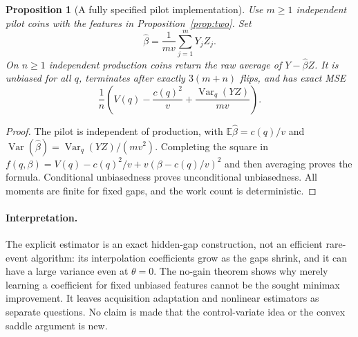 \documentclass[11pt]{article}
\newtheorem{proposition}[theorem]{Proposition}
\newcommand{\E}{\mathbb E}
\newcommand{\Var}{\operatorname{Var}}
\begin{document}
\begin{proposition}[A fully specified pilot implementation]
Use $m\ge1$ independent pilot coins with the features in
Proposition~\ref{prop:two}. Set
\[
 \widehat\beta=\frac1{mv}\sum_{j=1}^mY_jZ_j.
\]
On $n\ge1$ independent production coins return the raw average of
$Y-\widehat\beta Z$. It is unbiased for all $q$, terminates after exactly
$3(m+n)$ flips, and has exact MSE
\[
 \frac1n\left(V(q)-\frac{c(q)^2}{v}
             +\frac{\Var_q(YZ)}{mv}\right).
\]
\end{proposition}

\begin{proof}
The pilot is independent of production, with
$\E\widehat\beta=c(q)/v$ and
$\Var(\widehat\beta)=\Var_q(YZ)/(mv^2)$. Completing the square in
$f(q,\beta)=V(q)-c(q)^2/v+v(\beta-c(q)/v)^2$ and then averaging proves
the formula. Conditional unbiasedness proves unconditional unbiasedness.
All moments are finite for fixed gaps, and the work count is deterministic.
\end{proof}

\paragraph{Interpretation.}
The explicit estimator is an exact hidden-gap construction, not an efficient
rare-event algorithm: its interpolation coefficients grow as the gaps shrink,
and it can have a large variance even at $\theta=0$. The no-gain theorem
shows why merely learning a coefficient for fixed unbiased features cannot
be the sought minimax improvement. It leaves acquisition adaptation and
nonlinear estimators as separate questions. No claim is made that the
control-variate idea or the convex saddle argument is new.
\end{document}
